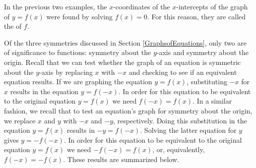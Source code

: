 \medskip


In the previous two examples, the $x$-coordinates of the $x$-intercepts of the graph of $y=f(x)$ were found by solving $f(x) = 0$.  For this reason, they are called the   of $f$.

\smallskip


\medskip

Of the three symmetries discussed in Section \ref{GraphsofEquations}, only two are of significance to functions:  symmetry about the $y$-axis and symmetry about the origin.  Recall that we can test whether the graph of an equation is symmetric about the $y$-axis by replacing $x$ with $-x$ and checking to see if an equivalent equation results.  If we are graphing the equation $y=f(x)$, substituting $-x$ for $x$ results in the equation $y=f(-x)$.  In order for this equation to be equivalent to the original equation $y=f(x)$ we need $f(-x) = f(x)$.  In a similar fashion, we recall that to test an equation's graph for symmetry about the origin, we replace $x$ and $y$ with $-x$ and $-y$, respectively.  Doing this substitution in the equation $y = f(x)$ results in $-y = f(-x)$.  Solving the latter equation for $y$ gives $y = -f(-x)$.  In order for this equation to be equivalent to the original equation $y=f(x)$ we need $-f(-x) = f(x)$, or, equivalently, $f(-x) = -f(x)$.  These results are summarized below.


\medskip


